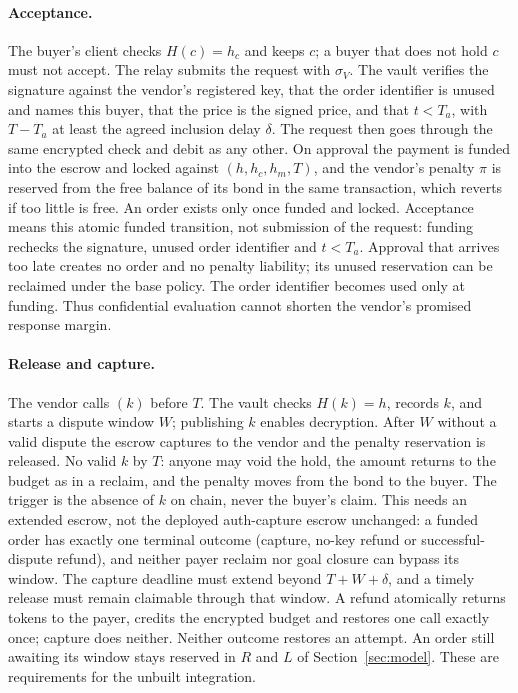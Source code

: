 \paragraph{Acceptance.} The buyer's client checks $H(c) = h_c$ and keeps $c$; a buyer that does not hold $c$ must not accept. The relay submits the request
with $\sigma_V$. The vault verifies the signature against the vendor's registered key, that the order identifier is unused and names this buyer, that the
price is the signed price, and that $t < T_a$, with $T - T_a$ at least the agreed inclusion delay $\delta$. The request then goes through the same encrypted
check and debit as any other. On approval the payment is funded into the escrow and locked against $(h, h_c, h_m, T)$, and the vendor's penalty $\pi$ is
reserved from the free balance of its bond in the same transaction, which reverts if too little is free. An order exists only once funded and locked.
Acceptance means this atomic funded transition, not submission of the request: funding rechecks the signature, unused order identifier and
$t < T_a$. Approval that arrives too late creates no order and no penalty liability; its unused reservation can be reclaimed under the base policy.
The order identifier becomes used only at funding. Thus confidential evaluation cannot shorten the vendor's promised response margin.

\paragraph{Release and capture.} The vendor calls $(k)$ before $T$. The vault checks $H(k) = h$, records $k$, and starts a dispute window $W$;
publishing $k$ enables decryption. After $W$ without a valid dispute the escrow captures to the vendor and the penalty reservation is released. No valid
$k$ by $T$: anyone may void the hold, the amount returns to the budget as in a reclaim, and the penalty moves from the bond to the buyer. The trigger is
the absence of $k$ on chain, never the buyer's claim. This needs an extended escrow, not the deployed auth-capture escrow unchanged: a funded order has
exactly one terminal outcome (capture, no-key refund or successful-dispute refund), and neither payer reclaim nor goal closure can bypass its window.
The capture deadline must extend beyond $T + W + \delta$, and a timely release must remain claimable through that window. A refund atomically returns
tokens to the payer, credits the encrypted budget and restores one call exactly once; capture does neither. Neither outcome restores an attempt.
An order still awaiting its window stays reserved in $R$ and $L$ of Section~\ref{sec:model}. These are requirements for the unbuilt integration.

